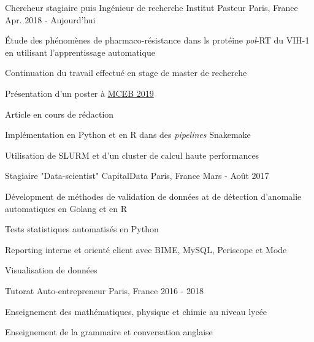 

\begin{cventries}

  \cventry
    {Chercheur stagiaire puis Ingénieur de recherche} %
    {Institut Pasteur} %
    {Paris, France} %
    {Apr. 2018 - Aujourd'hui} %
    {
      \begin{cvitems} %
        \item {Étude des phénomènes de pharmaco-résistance dans ls protéine \textit{pol}-RT du VIH-1 en utilisant l'apprentissage automatique}
        \item {Continuation du travail effectué en stage de master de recherche}
        \item {Présentation d'un poster à \href{http://www.lirmm.fr/mceb2019/}{MCEB 2019}}
        \item {Article en cours de rédaction}
        \item {Implémentation en Python et en R dans des \textit{pipelines} Snakemake}
        \item {Utilisation de SLURM et d'un cluster de calcul haute performances}
      \end{cvitems}
    }
    \cventry
    {Stagiaire "Data-scientist"} %
    {CapitalData} %
    {Paris, France} %
    {Mars - Août 2017} %
    {
      \begin{cvitems} %
        \item {Dévelopment de méthodes de validation de données at de détection d'anomalie automatiques en Golang et en R}
        \item {Tests statistiques automatisés en Python}
        \item {Reporting interne et orienté client avec BIME, MySQL, Periscope et Mode}
        \item {Visualisation de données}
      \end{cvitems}
    }
    \cventry
    {Tutorat} %
    {Auto-entrepreneur} %
    {Paris, France} %
    {2016 - 2018} %
    {
      \begin{cvitems} %
        \item {Enseignement des mathématiques, physique et chimie au niveau lycée}
        \item {Enseignement de la grammaire et conversation anglaise}
      \end{cvitems}
    }

\end{cventries}
